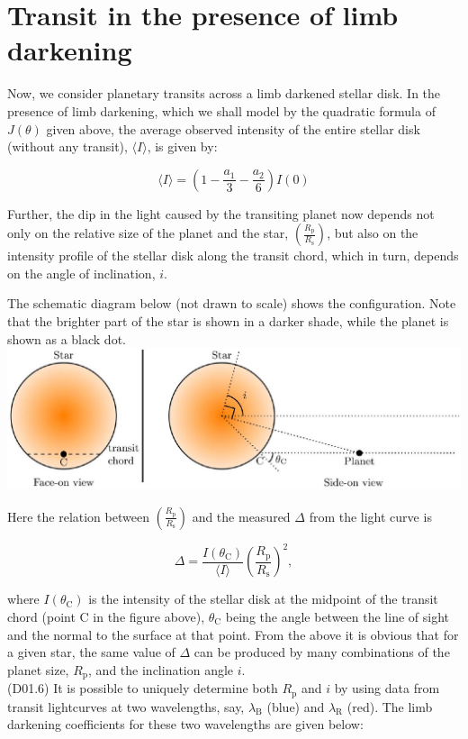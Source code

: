 \documentclass[10pt]{article}
\begin{document}
    \section*{Transit in the presence of limb darkening}
    Now, we consider planetary transits across a limb darkened stellar disk. In the presence of limb darkening, which we shall model by the quadratic formula of $J(\theta)$ given above, the average observed intensity of the entire stellar disk (without any transit), $\langle I\rangle$, is given by:
    
    $$
    \langle I\rangle=\left(1-\frac{a_{1}}{3}-\frac{a_{2}}{6}\right) I(0)
    $$
    
    Further, the dip in the light caused by the transiting planet now depends not only on the relative size of the planet and the star, $\left(\frac{R_{\mathrm{p}}}{R_{\mathrm{s}}}\right)$, but also on the intensity profile of the stellar disk along the transit chord, which in turn, depends on the angle of inclination, $i$.
    
    The schematic diagram below (not drawn to scale) shows the configuration. Note that the brighter part of the star is shown in a darker shade, while the planet is shown as a black dot.\\
    \includegraphics[max width=\textwidth, center]{2025_08_23_9a7c688c47c330d7bfc8g-4}
    
    Here the relation between $\left(\frac{R_{\mathrm{p}}}{R_{\mathrm{s}}}\right)$ and the measured $\Delta$ from the light curve is
    
    $$
    \Delta=\frac{I\left(\theta_{\mathrm{C}}\right)}{\langle I\rangle}\left(\frac{R_{\mathrm{p}}}{R_{\mathrm{s}}}\right)^{2},
    $$
    
    where $I\left(\theta_{\mathrm{C}}\right)$ is the intensity of the stellar disk at the midpoint of the transit chord (point C in the figure above), $\theta_{\mathrm{C}}$ being the angle between the line of sight and the normal to the surface at that point. From the above it is obvious that for a given star, the same value of $\Delta$ can be produced by many combinations of the planet size, $R_{\mathrm{p}}$, and the inclination angle $i$.\\
    (D01.6) It is possible to uniquely determine both $R_{\mathrm{p}}$ and $i$ by using data from transit lightcurves at two wavelengths, say, $\lambda_{\mathrm{B}}$ (blue) and $\lambda_{\mathrm{R}}$ (red). The limb darkening coefficients for these two wavelengths are given below:
    
\end{document}
